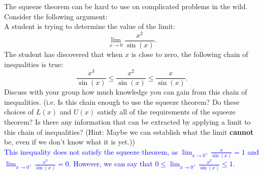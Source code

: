 \documentclass{ximera}
\begin{document}
\begin{exercise}
    The squeeze theorem can be hard to use on complicated problems in the wild.  Consider the following argument: \\
    A student is trying to determine the value of the limit: $$\lim_{x\rightarrow 0}\frac{x^2}{\sin(x)}.$$
    The student has discovered that when $x$ is close to zero, the following chain of inequalities is true: 
    $$\frac{x^3}{\sin(x)}\leq\frac{x^2}{\sin(x)}\leq\frac{x}{\sin(x)}.$$
    Discuss with your group how much knowledge you can gain from this chain of inequalities. (i.e. Is this chain enough to use the squeeze theorem?  Do these choices of $L(x)$ and $U(x)$ satisfy all of the requirements of the squeeze theorem?  Is there any information that can be extracted by applying a limit to this chain of inequalities? (Hint: Maybe we can establish what the limit \textbf{cannot} be, even if we don't know what it is yet.))\\
    \textcolor{blue}{This inequality does not satisfy the squeeze theorem, as $\lim_{x\rightarrow 0^+}\frac{x}{\sin(x)}=1$ and $\lim_{x\rightarrow 0^+}\frac{x^3}{\sin(x)}=0$. However, we can say that $0\leq \lim_{x\rightarrow 0^+}\frac{x^2}{\sin(x)}\leq 1$.}
     
\end{exercise}
\end{document}
